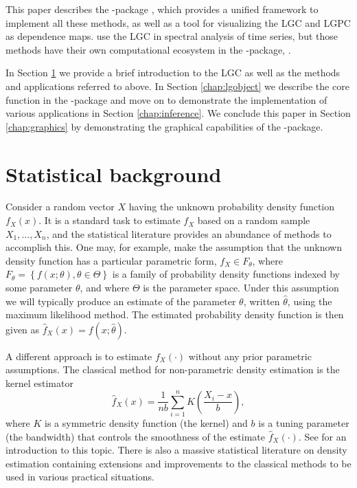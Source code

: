 This paper describes the -package \citep{otne:2019}, which provides a unified framework to implement all these methods, as well as a tool for visualizing the LGC and LGPC as dependence maps. \cite{jord:tjos:2017} use the LGC in spectral analysis of time series, but those methods have their own computational ecosystem in the -package, \cite{jord:2018}.

In Section \ref{chap:background} we provide a brief introduction to the LGC as well as the methods and applications referred to above. In Section \ref{chap:lgobject} we describe the core function in the -package and move on to demonstrate the implementation of various applications in Section \ref{chap:inference}. We conclude this paper in Section \ref{chap:graphics} by demonstrating the graphical capabilities of the -package.

\section{Statistical background} 
\label{chap:background}

Consider a random vector $X$ having the unknown probability density function $f_X\left(x\right)$. It is a standard task to estimate $f_X$ based on a random sample $X_1,\ldots, X_n$, and the statistical literature provides an abundance of methods to accomplish this. One may, for example, make the assumption that the unknown density function has a particular parametric form, $f_X \in F_{\theta}$, where $F_{\theta} = \left\{f(x;\theta), \theta \in \Theta\right\}$ is a family of probability density functions indexed by some parameter $\theta$, and where $\Theta$ is the parameter space. Under this assumption we will typically produce an estimate of the parameter $\theta$, written $\widehat \theta$, using the maximum likelihood method. The estimated probability density function is then given as $\widehat f_X\left(x\right) = f\left(x; \widehat\theta\right)$.

A different approach is to estimate $f_X\left(\cdot\right)$ without any prior parametric assumptions. The classical method for non-parametric density estimation is the kernel estimator 
$$\widehat f_X\left(x\right) = \frac{1}{nb}\sum_{i=1}^n K\left(\frac{X_i - x}{b}\right),$$
where $K$ is a symmetric density function (the kernel) and $b$ is a tuning parameter (the bandwidth) that controls the smoothness of the estimate $\widehat f_X\left(\cdot\right)$. See \cite{silv:1986} for an introduction to this topic. There is also a massive statistical literature on density estimation containing extensions and improvements to the classical methods to be used in various practical situations. 

